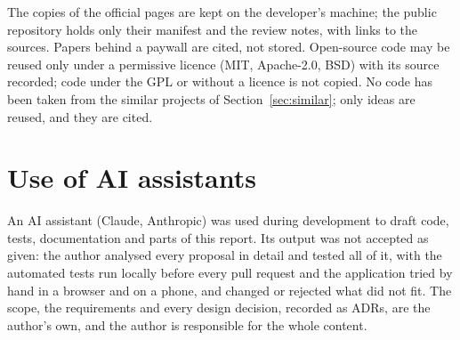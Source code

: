 The copies of the official pages are kept on the developer's machine; the public repository holds
only their manifest and the review notes, with links to the sources. Papers behind a paywall are
cited, not stored. Open-source code may be reused only under a permissive licence (MIT, Apache-2.0,
BSD) with its source recorded; code under the GPL or without a licence is not copied. No code has
been taken from the similar projects of Section~\ref{sec:similar}; only ideas are reused, and they
are cited.

\section{Use of AI assistants}\label{sec:ai-use}
An AI assistant (Claude, Anthropic) was used during development to draft code, tests,
documentation and parts of this report. Its output was not accepted as given: the author analysed
every proposal in detail and tested all of it, with the automated tests run locally before every
pull request and the application tried by hand in a browser and on a phone, and changed or
rejected what did not fit. The scope, the requirements and every design decision, recorded as
ADRs, are the author's own, and the author is responsible for the whole content.

